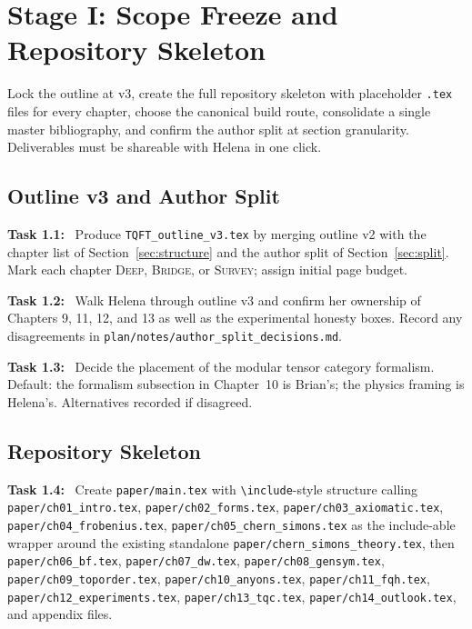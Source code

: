 \documentclass[11pt]{article}
\newcommand{\task}[1]{\medskip\noindent\textbf{Task #1:}\ }
\begin{document}
\section{Stage I: Scope Freeze and Repository Skeleton}\label{sec:stageI}

\begin{goalbox}[Objective]
Lock the outline at v3, create the full repository skeleton with placeholder \texttt{.tex}
files for every chapter, choose the canonical build route, consolidate a single master
bibliography, and confirm the author split at section granularity. Deliverables must be
shareable with Helena in one click.
\end{goalbox}

\subsection{Outline v3 and Author Split}

\task{1.1} Produce \texttt{TQFT\_outline\_v3.tex} by merging outline v2 with the
chapter list of Section~\ref{sec:structure} and the author split of
Section~\ref{sec:split}. Mark each chapter \textsc{Deep}, \textsc{Bridge}, or \textsc{Survey};
assign initial page budget.

\task{1.2} Walk Helena through outline v3 and confirm her ownership of Chapters 9, 11,
12, and 13 as well as the experimental honesty boxes. Record any disagreements in
\texttt{plan/notes/author\_split\_decisions.md}.

\task{1.3} Decide the placement of the modular tensor category formalism. Default: the
formalism subsection in Chapter~10 is Brian's; the physics framing is Helena's. Alternatives
recorded if disagreed.

\subsection{Repository Skeleton}

\task{1.4} Create \texttt{paper/main.tex} with \texttt{\textbackslash include}-style
structure calling \texttt{paper/ch01\_intro.tex}, \texttt{paper/ch02\_forms.tex},
\texttt{paper/ch03\_axiomatic.tex}, \texttt{paper/ch04\_frobenius.tex},
\texttt{paper/ch05\_chern\_simons.tex} as the include-able wrapper around the existing
standalone \texttt{paper/chern\_simons\_theory.tex}, then \texttt{paper/ch06\_bf.tex},
\texttt{paper/ch07\_dw.tex}, \texttt{paper/ch08\_gensym.tex},
\texttt{paper/ch09\_toporder.tex}, \texttt{paper/ch10\_anyons.tex},
\texttt{paper/ch11\_fqh.tex}, \texttt{paper/ch12\_experiments.tex},
\texttt{paper/ch13\_tqc.tex}, \texttt{paper/ch14\_outlook.tex}, and appendix files.
\end{document}

